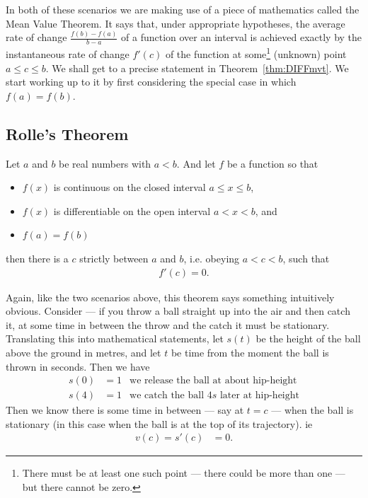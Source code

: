 In both of these scenarios we are making use of a piece of mathematics called the Mean
Value Theorem. It says that, under appropriate hypotheses, the average rate of change
$\frac{f(b)-f(a)}{b-a}$ of a function over an interval is achieved exactly by the
instantaneous rate of change $f'(c)$ of the function at some\footnote{There must be at
least one such point --- there could be more than one --- but there cannot be zero.}
(unknown) point $a\le c\le b$. We shall get to a precise statement in
Theorem~\ref{thm:DIFFmvt}. We start working up to it by first considering the special case
in which $f(a)=f(b)$.

\subsection*{Rolle's Theorem}
\begin{theorem}
\label{thm:DIFFrolle}
Let $a$ and $b$ be real numbers with $a<b$. And let $f$ be a function so that
\begin{itemize}
 \item $f(x)$ is continuous on the closed interval $a\le x\le b$,
  \item $f(x)$ is differentiable on the open interval $a<x<b$, and
 \item $f(a)=f(b)$
\end{itemize}
then there is a $c$ strictly between $a$ and $b$, i.e. obeying $a<c<b$, such that
\begin{align*}
f'(c)=0.
\end{align*}
\end{theorem}
Again, like the two scenarios above, this theorem says something intuitively obvious.
Consider --- if you throw a ball straight up into the air and then catch it, at some time
in between the throw and the catch it must be stationary. Translating this into
mathematical statements, let $s(t)$ be the height of the ball above the ground in metres,
and let $t$ be time from the moment the ball is thrown in seconds. Then we have
\begin{align*}
  s(0) &= 1 & \text{we release the ball at about hip-height} \\
  s(4) &= 1 & \text{we catch the ball $4s$ later at hip-height}
\end{align*}
Then we know there is some time in between --- say at $t=c$ --- when the ball is
stationary (in this case when the ball is at the top of its trajectory). ie
\begin{align*}
  v(c) = s'(c) &= 0.
\end{align*}
